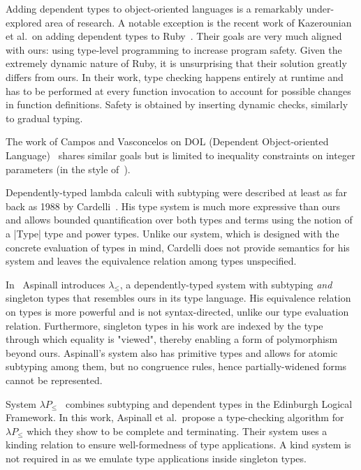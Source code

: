 Adding dependent types to object-oriented languages is a remarkably under-explored area of research.
A notable exception is the recent work of Kazerounian et al.~on adding dependent types to Ruby~\citep{kazerounian2019type}.
Their goals are very much aligned with ours: using type-level programming to increase program safety.
Given the extremely dynamic nature of Ruby, it is unsurprising that their solution greatly differs from ours.
In their work, type checking happens entirely at runtime and has to be performed at every function invocation to account for possible changes in function definitions.
Safety is obtained by inserting dynamic checks, similarly to gradual typing.

The work of Campos and Vasconcelos on DOL (Dependent Object-oriented Language)~\citep{campos2018dependent} shares similar goals but is limited to inequality constraints on integer parameters (in the style of~\citep{xi1998eliminating}).

Dependently-typed lambda calculi with subtyping were described at least as far back as 1988 by Cardelli~\citep{cardelli1988structural}.
His type system is much more expressive than ours and allows bounded quantification over both types and terms using the notion of a |Type| type and power types.
Unlike our system, which is designed with the concrete evaluation of types in mind, Cardelli does not provide semantics for his system and leaves the equivalence relation among types unspecified.

In~\citep{aspinall1994singleton} Aspinall introduces ${\lambda}_{\leq}{}$, a dependently-typed system with subtyping \emph{and} singleton types that resembles ours in its type language.
His equivalence relation on types is more powerful and is not syntax-directed, unlike our type evaluation relation.
Furthermore, singleton types in his work are indexed by the type through which equality is "viewed", thereby enabling a form of polymorphism beyond ours.
Aspinall's system also has primitive types and allows for atomic subtyping among them, but no congruence rules, hence partially-widened forms cannot be represented.

System ${\lambda}P_{\leq}$~\citep{aspinall1996subtyping} combines subtyping and dependent types in the Edinburgh Logical Framework.
In this work, Aspinall et al.~propose a type-checking algorithm for ${\lambda}P_{\leq}$ which they show to be complete and terminating.
Their system uses a kinding relation to ensure well-formedness of type applications.
A kind system is not required in \oursystem as we emulate type applications inside singleton types.

